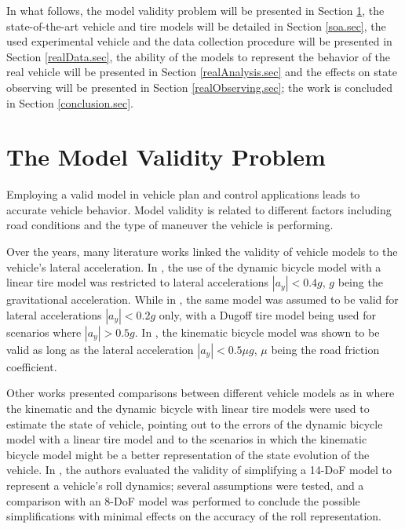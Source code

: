 \documentclass[journal]{IEEEtran}
\begin{document}
In what follows, the model validity problem will be presented in Section \ref{modelValidity.sec}, the state-of-the-art vehicle and tire models will be detailed in Section \ref{soa.sec}, the used experimental vehicle and the data collection procedure will be presented in Section \ref{realData.sec}, the ability of the models to represent the behavior of the real vehicle will be presented in Section \ref{realAnalysis.sec} and the effects on state observing will be presented in Section \ref{realObserving.sec}; the work is concluded in Section \ref{conclusion.sec}.

\section{The Model Validity Problem}\label{modelValidity.sec}
Employing a valid model in vehicle plan and control applications leads to accurate vehicle behavior. Model validity is related to different factors including road conditions and the type of maneuver the vehicle is performing. 

Over the years, many literature works linked the validity of vehicle models to the vehicle's lateral acceleration. In \cite{mitschke_dynamik_1990}, the use of the dynamic bicycle model with a linear tire model was restricted to lateral accelerations $|a_y|<0.4g$, $g$ being the gravitational acceleration. While in \cite{smith_effects_1995}, the same model was assumed to be valid for lateral accelerations $|a_y|<0.2g$ only, with a Dugoff \cite{dugoff_tire_1969} tire model being used for scenarios where $|a_y|>0.5g$. In \cite{polack_kinematic_2017}, the kinematic bicycle model was shown to be valid as long as the lateral acceleration $|a_y|<0.5\mu g$, $\mu$ being the road friction coefficient. 


Other works presented comparisons between different vehicle models as in \mbox{\cite{kong_kinematic_2015, kang_comparative_2014}} where the kinematic and the dynamic bicycle with linear tire models were used to estimate the state of vehicle, pointing out to the errors of the dynamic bicycle model with a linear tire model and to the scenarios in which the kinematic bicycle model might be a better representation of the state evolution of the vehicle. In \mbox{\cite{shim_understanding_2007}}, the authors evaluated the validity of simplifying a 14-DoF model to represent a vehicle's roll dynamics; several assumptions were tested, and a comparison with an 8-DoF model was performed to conclude the possible simplifications with minimal effects on the accuracy of the roll representation.
\end{document}
